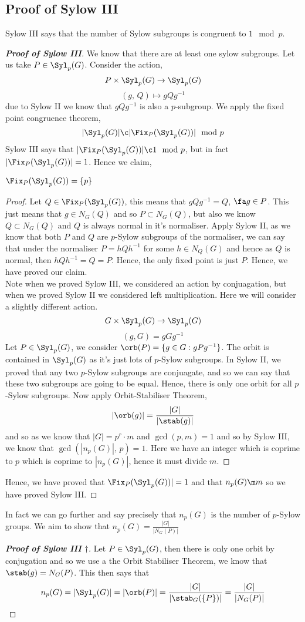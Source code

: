 \subsection{Proof of Sylow III}
Sylow III says that the number of Sylow subgroups is congruent to $1\mod p$.
\begin{proof}[\textbf{Proof of Sylow III}]
  We know that there are at least one sylow subgroups. Let us take $P \in \Syl_p(G)$. Consider the action,
  $$ P \times \Syl_p(G) \to \Syl_p(G) $$
  $$ (g,\,Q)\mapsto gQg^{-1} $$
  due to Sylow II we know that $gQg^{-1}$ is also a $p$-subgroup. We apply the fixed point congruence theorem,
  $$ |\Syl_p(G)| \c |\Fix_P(\Syl_p(G))| \mod p $$
  Sylow III says that $|\Fix_P(\Syl_p(G))| \c 1 \mod p$, but in fact $|\Fix_P(\Syl_p(G))| = 1$. Hence we claim,
  \begin{claim}
    $\Fix_P(\Syl_p(G)) = \{p\}$
  \end{claim}
  \begin{proof}
    Let $Q \in \Fix_{P}(\Syl_p(G))$, this means that $gQg^{-1} = Q$, $\fa g \in P$. This just means that $g \in N_G(Q)$ and so $P \subset N_G(Q)$, but also we know $Q \subset N_G(Q)$ and $Q$ is always normal in it's normaliser. Apply Sylow II, as we know that both $P$ and $Q$ are $p$-Sylow subgroups of the normaliser, we can say that under the normaliser $P = hQh^{-1}$ for some $h \in N_Q(G)$ and hence as $Q$ is normal, then $hQh^{-1} = Q = P$. Hence, the only fixed point is just $P$. Hence, we have proved our claim.\\

    Note when we proved Sylow III, we considered an action by conjuagation, but when we proved Sylow II we considered left multiplication. Here we will consider a slightly different action.
    $$ G\times \Syl_p(G) \to \Syl_p(G) $$
    $$ (g, G) = gGg^{-1} $$
    Let $P \in \Syl_p(G)$, we consider $\orb(P) = \{g \in G : gPg^{-1}\}$. The orbit is contained in $\Syl_p(G)$ as it's just lots of $p$-Sylow subgroups. In Sylow II, we proved that any two $p$-Sylow subgroups are conjuagate, and so we can say that these two subgroups are going to be equal. Hence, there is only one orbit for all $p$-Sylow subgroups. Now apply Orbit-Stabiliser Theorem,
    $$ |\orb(g)| = \frac{|G|}{|\stab (g)|} $$
    and so as we know that $|G| = p^r \cdot m$ and $\gcd(p, m)= 1$ and so by Sylow III, we know that $\gcd(|n_p(G)|,\, p) = 1$. Here we have an integer which is coprime to $p$ which is coprime to $|n_p(G)|$, hence it must divide $m$.
  \end{proof}
  Hence, we have proved that $\Fix_P(\Syl_p(G))| = 1$ and that $n_p(G) \m m$ so we have proved Sylow III.
\end{proof}
In fact we can go further and say precisely that $n_p(G)$ is the number of $p$-Sylow groups. We aim to show that $n_p(G) = \frac{|G|}{|N_G(P)|}$
\begin{proof}[\textbf{Proof of Sylow III $\dagger$}]

  Let $P \in \Syl_p(G)$, then there is only one orbit by conjugation and so we use a the Orbit Stabiliser Theorem, we know that $\stab(g) = N_G(P)$. This then says that
  $$ n_p(G) = |\Syl_p(G)| = |\orb(P)| = \frac{|G|}{|\stab_G(\{P\})|} = \frac{|G|}{|N_G(P)|} $$
\end{proof}

